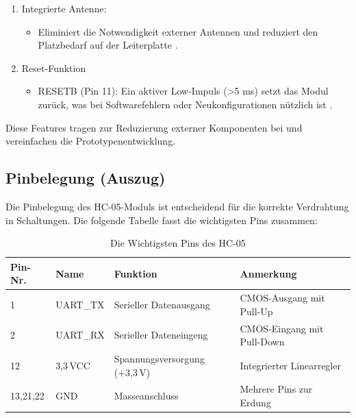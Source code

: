 \begin{enumerate}
    \item Integrierte Antenne:
    \begin{itemize}
        \item Eliminiert die Notwendigkeit externer Antennen und reduziert den Platzbedarf auf der Leiterplatte \cite{HC05Datasheet:2010}.
    \end{itemize}
    \item Reset-Funktion
    \begin{itemize}
        \item RESETB (Pin 11): Ein aktiver Low-Impuls (>5 ms) setzt das Modul zurück, was bei Softwarefehlern oder Neukonfigurationen nützlich ist \cite{HC05Datasheet:2010}.
    \end{itemize}
\end{enumerate}
Diese Features tragen zur Reduzierung externer Komponenten bei und vereinfachen die Prototypenentwicklung.



\subsection{Pinbelegung (Auszug)}

Die Pinbelegung des HC-05-Moduls ist entscheidend für die korrekte Verdrahtung in Schaltungen. Die folgende Tabelle fasst die wichtigsten Pins zusammen:

\begin{table}[h]
    \centering
    \caption{Die Wichtigsten Pins des HC-05}
    \begin{tabular}{|l|l|l|l|}
        \hline
        \textbf{Pin-Nr.} & \textbf{Name} & \textbf{Funktion} 			 & 		\textbf{Anmerkung}	   \\ \hline
        1	 		 & 	UART\_TX 	 & Serieller Datenausgang   	 &  CMOS-Ausgang mit Pull-Up   \\ \hline
        2		 	 &	UART\_RX	 & Serieller Dateneingeng		 &  CMOS-Eingang mit Pull-Down \\ \hline
        12   		 &	3,3\,VCC     & Spannungsversorgung (+3,3\,V) &  Integrierter Linearregler  \\ \hline
        13,21,22		 &	GND		     & Masseanschluss				 &  Mehrere Pins zur Erdung    \\ \hline
        
    \end{tabular}
    \label{tab:Pin Belegung}
\end{table}


